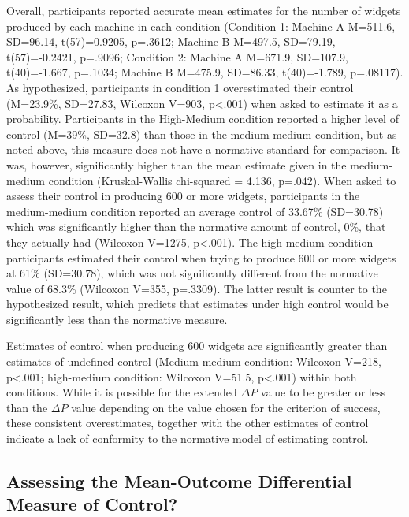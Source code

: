 \documentclass[USenglish,letterpaper,12pt,extrafontsizes,oneside,onecolumn,final]{memoir}
\newcommand{\deltap}{$\Delta P$}
\begin{document}
Overall, participants reported accurate mean estimates for the number of widgets produced by each machine in each condition (Condition 1: Machine A M=511.6, SD=96.14, t(57)=0.9205, p=.3612; Machine B M=497.5, SD=79.19, t(57)=-0.2421, p=.9096; Condition 2: Machine A M=671.9,
SD=107.9, t(40)=-1.667, p=.1034; Machine B M=475.9, SD=86.33, t(40)=-1.789, p=.08117). As hypothesized, participants in condition 1 overestimated their control (M=23.9\%, SD=27.83, Wilcoxon V=903, p<.001) when asked to estimate it as a probability. Participants in the High-Medium condition reported a higher level of control (M=39\%, SD=32.8) than those in the medium-medium condition, but as noted above, this measure does not have a normative standard for comparison. It was, however, significantly higher than the mean estimate given in the medium-medium condition (Kruskal-Wallis chi-squared = 4.136, p=.042). When asked to assess their control in producing 600 or more widgets, participants in the medium-medium condition reported an average control of 33.67\% (SD=30.78) which was significantly higher than the normative amount of control, 0\%, that they actually had (Wilcoxon V=1275, p<.001). The high-medium condition participants estimated their control when trying to produce 600 or more widgets at 61\% (SD=30.78), which was not significantly different from the normative value of 68.3\% (Wilcoxon V=355, p=.3309). The latter result is counter to the hypothesized result, which predicts that estimates under high control would be significantly less than the normative measure.  

Estimates of control when producing 600 widgets are significantly greater than estimates of undefined control (Medium-medium condition: Wilcoxon V=218, p<.001; high-medium condition: Wilcoxon V=51.5, p<.001) within both conditions.  While it is possible for the extended \deltap \xspace value to be greater or less than the \deltap \xspace value depending on the value chosen for the criterion of success, these consistent overestimates, together with the other estimates of control indicate a lack of conformity to the normative model of estimating control.

\subsection{Assessing the Mean-Outcome Differential Measure of Control?}
\end{document}

